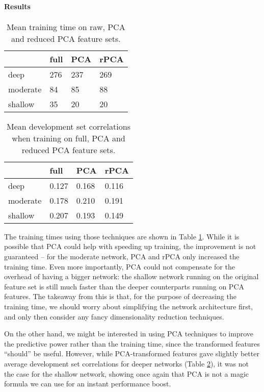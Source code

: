 \documentclass[10pt, twocolumn]{article}
\begin{document}

\paragraph{Results} 
\begin{table}[]
	\begin{tabularx}{\linewidth}{XXXX}
		\hline
				& \textbf{full} & \textbf{PCA} & \textbf{rPCA}\\ \hline
		deep    & 276   & 237  & 269 \\
		moderate  & 84 & 85 & 88 \\
		shallow & 35 & 20 & 20
		\end{tabularx}
\caption{Mean training time on raw, PCA and reduced PCA feature sets.}\label{g2}
\end{table}

\begin{table}[]
	\begin{tabularx}{\linewidth}{XXXX}
		\hline
				& \textbf{full} & \textbf{PCA} & \textbf{rPCA}\\ \hline
		deep    & 0.127   & 0.168  & 0.116 \\
		moderate  & 0.178 & 0.210 & 0.191 \\
		shallow & 0.207 & 0.193 & 0.149
		\end{tabularx}
\caption{Mean development set correlations when training on full, PCA and reduced PCA feature sets.}\label{g3}
\end{table}

The training times using those techniques are shown in Table \ref{g2}. While it is possible that PCA could help with speeding up training, the improvement is not guaranteed – for the moderate network, PCA and rPCA only increased the training time. Even more importantly, PCA could not compensate for the overhead of having a bigger network: the shallow network running on the original feature set is still much faster than the deeper counterparts running on PCA features. The takeaway from this is that, for the purpose of decreasing the training time, we should worry about simplifying the network architecture first, and only then consider any fancy dimensionality reduction techniques.

On the other hand, we might be interested in using PCA techniques to improve the predictive power rather than the training time, since the transformed features “should” be useful. However, while PCA-transformed features gave slightly better average development set correlations for deeper networks (Table \ref{g3}), it was not the case for the shallow network, showing once again that PCA is not a magic formula we can use for an instant performance boost.
\end{document}
